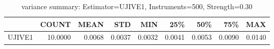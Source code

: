 \begin{table}[ht]
\centering
\caption{variance summary: Estimator=UJIVE1, Instruments=500, Strength=0.30}
\begin{tabular}{lrrrrrrrr}
\toprule
 & COUNT & MEAN & STD & MIN & 25\% & 50\% & 75\% & MAX \\
\midrule
UJIVE1 & 10.0000 & 0.0068 & 0.0037 & 0.0032 & 0.0041 & 0.0053 & 0.0090 & 0.0140 \\
\bottomrule
\end{tabular}
\end{table}
